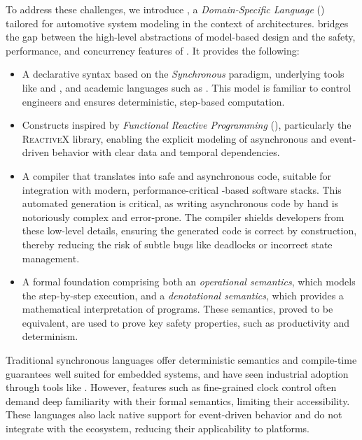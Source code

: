 To address these challenges, we introduce \GRust, a \emph{Domain-Specific Language} (\dsl) tailored
for automotive system modeling in the context of \sdv architectures. \GRust bridges the gap between
the high-level abstractions of model-based design and the safety, performance, and concurrency
features of \Rust. It provides the following:
%
\begin{itemize}
    \item A declarative syntax based on the \emph{Synchronous} paradigm, underlying tools like
          \Simulink and \Scade, and academic languages such as \Lustre. This model is familiar to
          control engineers and ensures deterministic, step-based computation.
    \item Constructs inspired by \emph{Functional Reactive Programming} (\frp), particularly the
          \textsc{ReactiveX} library, enabling the explicit modeling of asynchronous and
          event-driven behavior with clear data and temporal dependencies.
    \item A compiler that translates \GRust into safe and asynchronous \Rust code, suitable for
          integration with modern, performance-critical \Rust-based \sdv software stacks. This
          automated generation is critical, as writing asynchronous code by hand is notoriously
          complex and error-prone. The compiler shields developers from these low-level details,
          ensuring the generated code is correct by construction, thereby reducing the risk of
          subtle bugs like deadlocks or incorrect state management.
    \item A formal foundation comprising both an \emph{operational semantics}, which models the
          step-by-step execution, and a \emph{denotational semantics}, which provides a mathematical
          interpretation of programs. These semantics, proved to be equivalent, are used to prove
          key safety properties, such as productivity and determinism.
\end{itemize}

Traditional synchronous languages offer deterministic semantics and compile-time
guarantees well suited for embedded systems, and have seen industrial adoption through tools like
\Scade. However, features such as fine-grained clock control often demand deep familiarity with
their formal semantics, limiting their accessibility. These languages also lack native support for
event-driven behavior and do not integrate with the \Rust ecosystem, reducing their applicability to
\sdv platforms.

